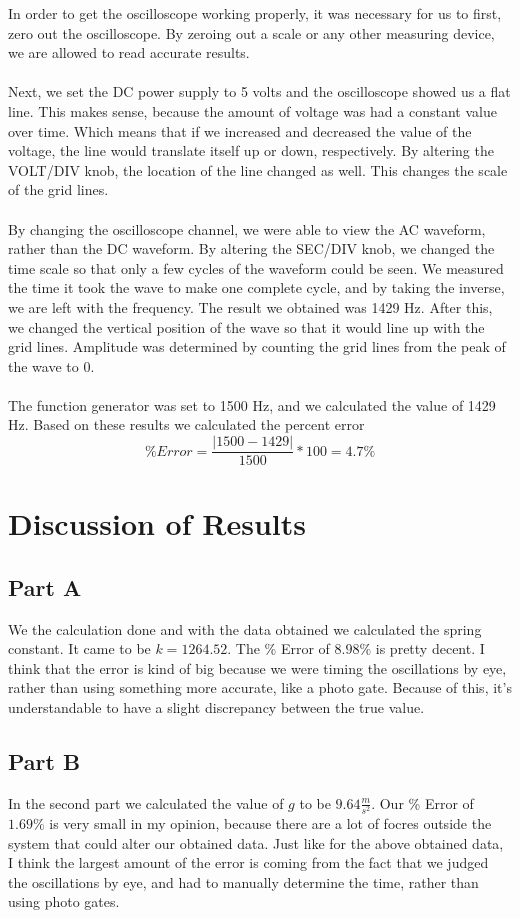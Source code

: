 \documentclass[titlepage]{article}
\begin{document}
In order to get the oscilloscope working properly, it was necessary for us to first, zero out the oscilloscope. By zeroing out a scale or any other measuring device, we are allowed to read accurate results.\\
\\
Next, we set the DC power supply to 5 volts and the oscilloscope showed us a flat line. This makes sense, because the amount of voltage was had a constant value over time. Which means that if we increased and decreased the value of the voltage, the line would translate itself up or down, respectively. By altering the VOLT/DIV knob, the location of the line changed as well. This changes the scale of the grid lines.\\
\\
By changing the oscilloscope channel, we were able to view the AC waveform, rather than the DC waveform. By altering the SEC/DIV knob, we changed the time scale so that only a few cycles of the waveform could be seen. We measured the time it took the wave to make one complete cycle, and by taking the inverse, we are left with the frequency. The result we obtained was 1429 Hz. After this, we changed the vertical position of the wave so that it would line up with the grid lines. Amplitude was determined by counting the grid lines from the peak of the wave to 0.\\
\\
The function generator was set to 1500 Hz, and we calculated the value of 1429 Hz. Based on these results we calculated the percent error
\[
	\% Error = \frac{|1500 - 1429|}{1500} * 100 = 4.7\%
\]

\section{Discussion of Results}\label{sec:discussion_of_results}
\subsection{Part A}\label{sub:part_a}
We the calculation done and with the data obtained we calculated the spring constant. It came to be $k = 1264.52$. The \% Error of $8.98\%$ is pretty decent. I think that the error is kind of big because we were timing the oscillations by eye, rather than using something more accurate, like a photo gate. Because of this, it's understandable to have a slight discrepancy between the true value.

\subsection{Part B}\label{sub:part_b}
In the second part we calculated the value of $g$ to be $9.64 \frac{m}{s^2}$. Our \% Error of $1.69\%$ is very small in my opinion, because there are a lot of focres outside the system that could alter our obtained data. Just like for the above obtained data, I think the largest amount of the error is coming from the fact that we judged the oscillations by eye, and had to manually determine the time, rather than using photo gates.
\end{document}
